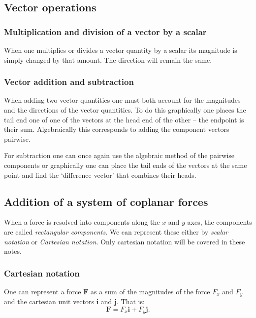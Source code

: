 \subsection{Vector operations}
\subsubsection{Multiplication and division of a vector by a scalar}
When one multiplies or divides a vector quantity by a scalar its magnitude is simply changed by that amount. The direction will remain the same.

\subsubsection{Vector addition and subtraction} \label{sec:vecadd}
When adding two vector quantities one must both account for the magnitudes and the directions of the vector quantities. To do this graphically one places the tail end one of one of the vectors at the head end of the other – the endpoint is their sum. Algebraically this corresponds to adding the component vectors pairwise. 

For subtraction one can once again use the algebraic method of the pairwise components or graphically one can place the tail ends of the vectors at the same point and find the `difference vector' that combines their heads.


\subsection{Addition of a system of coplanar forces}
When a force is resolved into components along the $x$ and $y$ axes, the components are called \textit{rectangular components}. We can represent these either by \textit{scalar notation} or \textit{Cartesian notation}. Only cartesian notation will be covered in these notes. 

\subsubsection{Cartesian notation}
One can represent a force $\textbf{F}$ as a sum of the magnitudes of the force $F_x$ and $F_y$ and the cartesian unit vectors $\textbf{i}$ and $\textbf{j}$. That is:
\[ 
\textbf{F} = F_x \textbf{i} + F_y \textbf{j}
.\]


